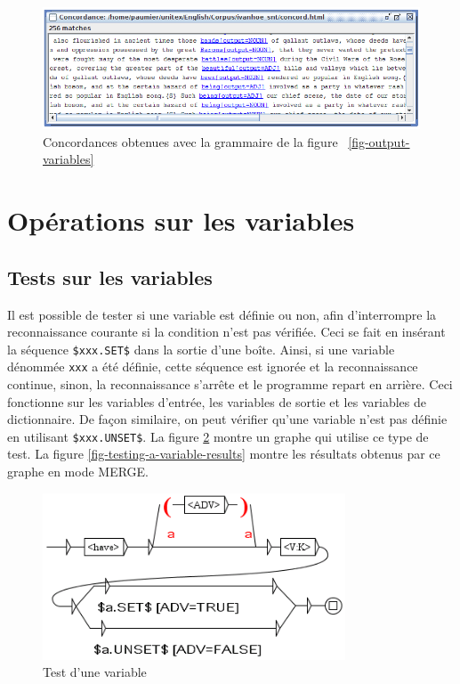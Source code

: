 \begin{figure}[!ht]
\begin{center}
\includegraphics[width=15cm]{resources/img/fig6-17s.png}
\caption{Concordances obtenues avec la grammaire de la figure ~\ref{fig-output-variables}\label{fig-output-variables-concord}}
\end{center}
\end{figure}


\section{Opérations sur les variables}
\label{section-ops-on-variables}
\subsection{Tests sur les variables}

\noindent Il est possible de tester si une variable est définie ou non, afin d'interrompre la
reconnaissance courante si la condition n'est pas vérifiée. Ceci se fait en insérant la  séquence
\verb+$xxx.SET$+ dans la sortie d'une boîte. Ainsi, si une variable dénommée \verb+xxx+ a été définie,
cette séquence est ignorée et la reconnaissance continue, sinon, la reconnaissance s'arrête
et le programme repart en arrière. Ceci fonctionne sur les variables d'entrée, les variables de
sortie et les variables de dictionnaire. De façon similaire, on peut vérifier qu'une variable n'est
pas définie en utilisant \verb+$xxx.UNSET$+. La figure \ref{fig-testing-a-variable} montre un graphe
qui utilise ce type de test. La figure \ref{fig-testing-a-variable-results} montre les résultats obtenus par ce graphe en mode MERGE.

\begin{figure}[!ht]
\begin{center}
\includegraphics[width=9cm]{resources/img/fig6-29b.png}
\caption{Test d'une variable\label{fig-testing-a-variable}}
\end{center}
\end{figure}

